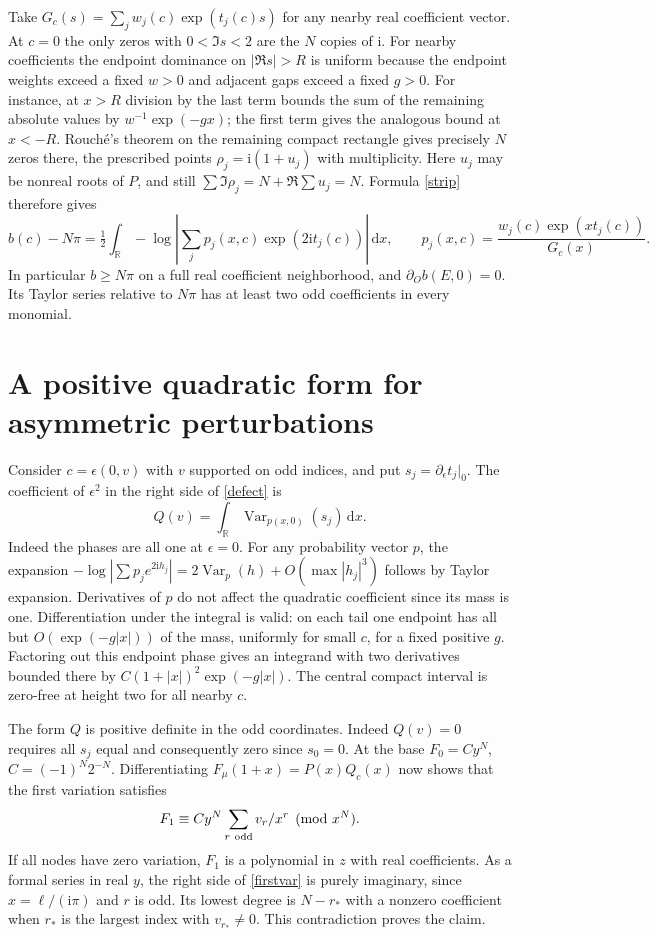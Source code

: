 \documentclass[11pt]{article}
\newcommand{\dd}{\mathrm d}
\newcommand{\ii}{\mathrm i}
\begin{document}
Take $G_c(s)=\sum_jw_j(c)\exp(t_j(c)s)$ for any nearby real coefficient vector.
At $c=0$ the only zeros with $0<\Im s<2$ are the $N$ copies of $\ii$.
For nearby coefficients the endpoint dominance on $|\Re s|>R$ is uniform
because the endpoint weights exceed a fixed $w>0$ and adjacent gaps exceed a
fixed $g>0$. For instance, at $x>R$ division by the last term bounds the
sum of the remaining absolute values by $w^{-1}\exp(-gx)$; the first term
gives the analogous bound at $x<-R$.
Rouch\'e's theorem on the remaining compact rectangle gives precisely $N$
zeros there, the prescribed points $\rho_j=\ii(1+u_j)$ with multiplicity.
Here $u_j$ may be nonreal roots of $P$, and still
$\sum\Im\rho_j=N+\Re\sum u_j=N$. Formula \eqref{strip} therefore gives
\begin{equation}\label{defect}
 b(c)-N\pi=\tfrac12\int_{\mathbb R}
   -\log\left|\sum_j p_j(x,c)\exp(2\ii t_j(c))\right|\,\dd x,\qquad
 p_j(x,c)=\frac{w_j(c)\exp(xt_j(c))}{G_c(x)} .
\end{equation}
In particular $b\ge N\pi$ on a full real coefficient neighborhood, and
$\partial_O b(E,0)=0$. Its Taylor series relative to $N\pi$ has at least
two odd coefficients in every monomial.

\section{A positive quadratic form for asymmetric perturbations}
Consider $c=\epsilon(0,v)$ with $v$ supported on odd indices, and put
$s_j=\partial_\epsilon t_j|_0$. The coefficient of $\epsilon^2$ in
the right side of \eqref{defect} is
\begin{equation}\label{quad}
 Q(v)=\int_{\mathbb R}\operatorname{Var}_{p(x,0)}(s_j)\,\dd x.
\end{equation}
Indeed the phases are all one at $\epsilon=0$. For any probability vector
$p$, the expansion $-\log|\sum p_j e^{2\ii h_j}|
=2\operatorname{Var}_p(h)+O(\max|h_j|^3)$ follows by Taylor expansion.
Derivatives of $p$ do not affect the quadratic coefficient since its mass
is one. Differentiation under the integral is valid: on each tail one
endpoint has all but $O(\exp(-g|x|))$ of the mass, uniformly for small
$c$, for a fixed positive $g$. Factoring out this endpoint phase gives
an integrand with two derivatives bounded there by
$C(1+|x|)^2\exp(-g|x|)$. The central compact interval is zero-free at
height two for all nearby $c$.

The form $Q$ is positive definite in the odd coordinates.
Indeed $Q(v)=0$ requires all $s_j$ equal and consequently zero since
$s_0=0$. At the base $F_0=Cy^N$, $C=(-1)^N2^{-N}$. Differentiating
$F_\mu(1+x)=P(x)Q_c(x)$ now shows that the first variation satisfies
\begin{equation}\label{firstvar}
 F_1\equiv C y^N\sum_{r\ {\rm odd}} v_r/x^r\pmod{x^N}.
\end{equation}
If all nodes have zero variation, $F_1$ is a polynomial in $z$ with real
coefficients. As a formal series in real $y$, the right side of
\eqref{firstvar} is purely imaginary, since $x=\ell/(\ii\pi)$ and $r$ is
odd. Its lowest degree is $N-r_*$ with a nonzero coefficient when $r_*$
is the largest index with $v_{r_*}\ne0$. This contradiction proves the
claim.
\end{document}
